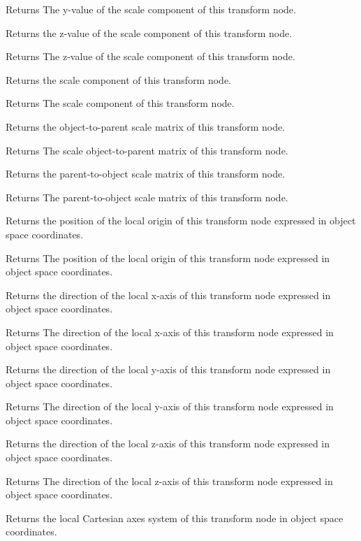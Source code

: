 \begin{DoxyReturn}{Returns}
The y-\/value of the scale component of this transform node.
\end{DoxyReturn}
Returns the z-\/value of the scale component of this transform node.

\begin{DoxyReturn}{Returns}
The z-\/value of the scale component of this transform node.
\end{DoxyReturn}
Returns the scale component of this transform node.

\begin{DoxyReturn}{Returns}
The scale component of this transform node.
\end{DoxyReturn}
Returns the object-\/to-\/parent scale matrix of this transform node.

\begin{DoxyReturn}{Returns}
The scale object-\/to-\/parent matrix of this transform node.
\end{DoxyReturn}
Returns the parent-\/to-\/object scale matrix of this transform node.

\begin{DoxyReturn}{Returns}
The parent-\/to-\/object scale matrix of this transform node.
\end{DoxyReturn}
Returns the position of the local origin of this transform node expressed in object space coordinates.

\begin{DoxyReturn}{Returns}
The position of the local origin of this transform node expressed in object space coordinates.
\end{DoxyReturn}
Returns the direction of the local x-\/axis of this transform node expressed in object space coordinates.

\begin{DoxyReturn}{Returns}
The direction of the local x-\/axis of this transform node expressed in object space coordinates.
\end{DoxyReturn}
Returns the direction of the local y-\/axis of this transform node expressed in object space coordinates.

\begin{DoxyReturn}{Returns}
The direction of the local y-\/axis of this transform node expressed in object space coordinates.
\end{DoxyReturn}
Returns the direction of the local z-\/axis of this transform node expressed in object space coordinates.

\begin{DoxyReturn}{Returns}
The direction of the local z-\/axis of this transform node expressed in object space coordinates.
\end{DoxyReturn}
Returns the local Cartesian axes system of this transform node in object space coordinates.

